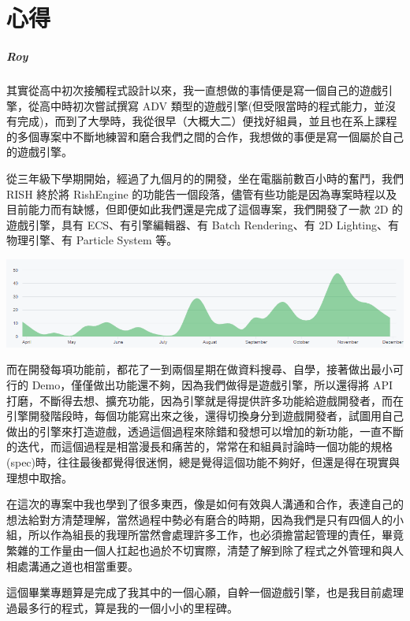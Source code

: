 \chapter{心得}

\paragraph{Roy} %
\label{par:Roy}


其實從高中初次接觸程式設計以來，我一直想做的事情便是寫一個自己的遊戲引擎，從高中時初次嘗試撰寫 ADV 類型的遊戲引擎(但受限當時的程式能力，並沒有完成)，而到了大學時，我從很早（大概大二）便找好組員，並且也在系上課程的多個專案中不斷地練習和磨合我們之間的合作，我想做的事便是寫一個屬於自己的遊戲引擎。

從三年級下學期開始，經過了九個月的的開發，坐在電腦前數百小時的奮鬥，我們 RISH 終於將 RishEngine 的功能告一個段落，儘管有些功能是因為專案時程以及目前能力而有缺憾，但即便如此我們還是完成了這個專案，我們開發了一款 2D 的遊戲引擎，具有 ECS、有引擎編輯器、有 Batch Rendering、有 2D Lighting、有物理引擎、有 Particle System 等。

\includegraphics[width=\textwidth]{./resources/commit.png}

而在開發每項功能前，都花了一到兩個星期在做資料搜尋、自學，接著做出最小可行的 Demo，僅僅做出功能還不夠，因為我們做得是遊戲引擎，所以還得將 API 打磨，不斷得去想、擴充功能，因為引擎就是得提供許多功能給遊戲開發者，而在引擎開發階段時，每個功能寫出來之後，還得切換身分到遊戲開發者，試圖用自己做出的引擎來打造遊戲，透過這個過程來除錯和發想可以增加的新功能，一直不斷的迭代，而這個過程是相當漫長和痛苦的，常常在和組員討論時一個功能的規格(spec)時，往往最後都覺得很迷惘，總是覺得這個功能不夠好，但還是得在現實與理想中取捨。

在這次的專案中我也學到了很多東西，像是如何有效與人溝通和合作，表達自己的想法給對方清楚理解，當然過程中勢必有磨合的時期，因為我們是只有四個人的小組，所以作為組長的我理所當然會處理許多工作，也必須擔當起管理的責任，畢竟繁雜的工作量由一個人扛起也過於不切實際，清楚了解到除了程式之外管理和與人相處溝通之道也相當重要。

這個畢業專題算是完成了我其中的一個心願，自幹一個遊戲引擎，也是我目前處理過最多行的程式，算是我的一個小小的里程碑。


\newpage